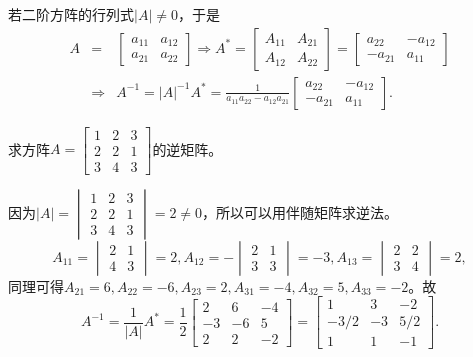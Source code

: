 \begin{eg}
若二阶方阵的行列式$|A| \neq 0$，于是
\begin{eqnarray*}
A & = & \begin{bmatrix} a_{11} & a_{12} \\ a_{21} & a_{22} \end{bmatrix} \Rightarrow A^{\ast} = \begin{bmatrix} A_{11} & A_{21} \\ A_{12} & A_{22} \end{bmatrix} = \begin{bmatrix} a_{22} & -a_{12} \\ -a_{21} & a_{11} \end{bmatrix} \\
& \Rightarrow & A^{-1} = |A|^{-1}A^{\ast} = \frac{1}{a_{11}a_{22} - a_{12}a_{21}} \begin{bmatrix} a_{22} & -a_{12} \\ -a_{21} & a_{11} \end{bmatrix}.
\end{eqnarray*}
\end{eg}

\begin{eg}
求方阵$A = \begin{bmatrix} 1 & 2 & 3 \\ 2 & 2 & 1 \\ 3 & 4 & 3 \end{bmatrix}$的逆矩阵。
\end{eg}

\begin{solution}
因为$|A| = \begin{vmatrix} 1 & 2 & 3 \\ 2 & 2 & 1 \\ 3 & 4 & 3 \end{vmatrix} = 2 \neq 0$，所以可以用伴随矩阵求逆法。
$$A_{11} = \begin{vmatrix} 2 & 1 \\ 4 & 3 \end{vmatrix} = 2, A_{12} = -\begin{vmatrix} 2 & 1 \\ 3 & 3 \end{vmatrix} = -3, A_{13} = \begin{vmatrix} 2 & 2 \\ 3 & 4 \end{vmatrix} = 2,$$
同理可得$A_{21} = 6, A_{22} = -6, A_{23} = 2, A_{31} = -4, A_{32} = 5, A_{33} = -2$。故
$$A^{-1} = \frac{1}{|A|}A^{\ast} = \frac12 \begin{bmatrix} 2 & 6 & -4 \\ -3 & -6 & 5 \\ 2 & 2 & -2 \end{bmatrix} = \begin{bmatrix} 1 & 3 & -2 \\ -3/2 & -3 & 5/2 \\ 1 & 1 & -1 \end{bmatrix}.$$
\end{solution}

